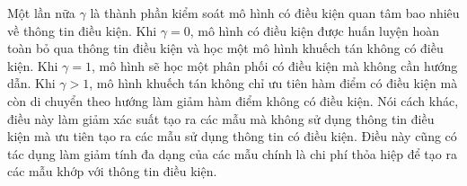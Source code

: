 \documentclass[14pt, a4paper]{article}
\numberwithin{equation}{section}
\numberwithin{figure}{section}
\numberwithin{dl}{section}
\numberwithin{md}{section}
\numberwithin{bd}{section}
\numberwithin{dn}{section}
\numberwithin{hq}{section}
\begin{document}
    Một lần nữa $\gamma$ là thành phần kiểm soát mô hình có điều kiện quan tâm bao nhiêu về thông tin điều kiện.
    Khi $\gamma = 0$, mô hình có điều kiện được huấn luyện hoàn toàn bỏ qua thông tin điều kiện và học một mô hình khuếch tán không có điều kiện.
    Khi $\gamma=1$, mô hình sẽ học một phân phối có điều kiện mà không cần hướng dẫn.
    Khi $\gamma > 1$, mô hình khuếch tán không chỉ ưu tiên hàm điểm có điều kiện mà còn di chuyển theo hướng làm giảm hàm điểm không có điều kiện.
    Nói cách khác, điều này làm giảm xác suất tạo ra các mẫu mà không sử dụng thông tin điều kiện mà ưu tiên tạo ra các mẫu sử dụng thông tin có điều kiện.
    Điều này cũng có tác dụng làm giảm tính đa dạng của các mẫu chính là chi phí thỏa hiệp để tạo ra các mẫu khớp với thông tin điều kiện.
\end{document}
